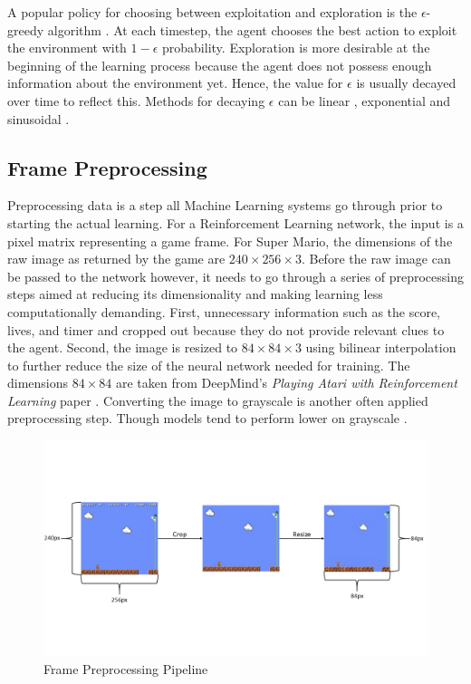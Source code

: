 \documentclass[notitlepage,a4paper,11pt]{article}
\begin{document}
A popular policy for choosing between exploitation and exploration is the $\epsilon$-greedy algorithm \cite{white2012bandit}. At each timestep, the agent chooses the best action to exploit the environment with $1-\epsilon$ probability. Exploration is more desirable at the beginning of the learning process because the agent does not possess enough information about the environment yet. Hence, the value for $\epsilon$ is usually decayed over time to reflect this. Methods for decaying $\epsilon$ can be linear \cite{mnih2015human}, exponential \cite{maroti2019rbed} and sinusoidal  \cite{chuchro2017game}.


\subsection{Frame Preprocessing} \label{frame_preprocessing}
Preprocessing data is a step all Machine Learning systems go through prior to starting the actual learning. For a Reinforcement Learning network, the input is a pixel matrix representing a game frame. For Super Mario, the dimensions of the raw image as returned by the game are $240 \times 256 \times 3$. Before the raw image can be passed to the network however, it needs to go through a series of preprocessing steps aimed at reducing its dimensionality and making learning less computationally demanding. First, unnecessary information such as the score, lives, and timer and cropped out because they do not provide relevant clues to the agent. Second, the image is resized to $84 \times 84 \times 3$ using bilinear interpolation \cite{gribbon2004novel} to further reduce the size of the neural network needed for training. The dimensions $84 \times 84$ are taken from DeepMind's \textit{Playing Atari with Reinforcement Learning} paper \cite{DBLP:journals/corr/MnihKSGAWR13}. Converting the image to grayscale is another often applied preprocessing step. Though models tend to perform lower on grayscale \cite{lample2017playing}.

\begin{figure}[!htb]
\centering
\includegraphics[trim={0 4.5cm 0 5cm},clip,width=1\linewidth]{figs/frame_preprocessing.png}
\caption{Frame Preprocessing Pipeline}
\end{figure}
\end{document}
